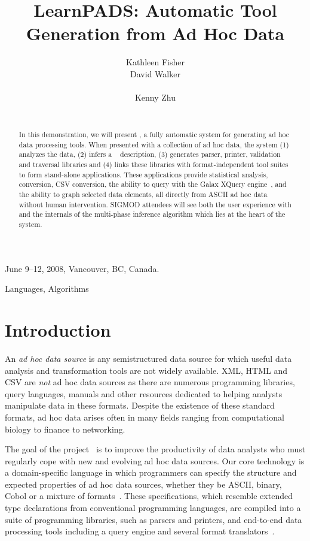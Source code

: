 \documentclass{sig-alt-release2}
\title{LearnPADS: Automatic Tool Generation from Ad Hoc Data}
\author{\alignauthor Kathleen Fisher \\
\affaddr{AT\&T Labs Research}
\email{kfisher@research.att.com}
\alignauthor David Walker \\
\affaddr{Princeton University}\\
\email{dpw@cs.princeton.edu}
\alignauthor Kenny Zhu \\
\affaddr{Princeton University}\\
\email{kzhu@cs.princeton.edu}
}
\begin{document}
 {June 9--12, 2008, Vancouver, BC, Canada.} 

\maketitle
\begin{abstract}
In this demonstration, we will present \learnpads, 
a fully automatic system for generating
ad hoc data processing tools.  When presented with a collection of
ad hoc data, the system (1) analyzes the data, (2) infers a 
\pads{}~\cite{fisher+:pads,fisher+:popl06} description, (3) 
generates parser, printer, validation and traversal libraries and (4)
links these libraries with format-independent  
tool suites to form stand-alone applications.  These applications provide
statistical analysis, \xml{}
conversion, CSV conversion, the ability to query with the 
Galax XQuery engine~\cite{fernandez+:padx}, and the ability to 
graph selected data elements, all
directly from ASCII ad hoc data without human intervention.
SIGMOD attendees will see both the user experience with \learnpads{} and
the internals of the multi-phase inference algorithm which lies at
the heart of the system. 
\end{abstract}


\terms
Languages, Algorithms

\section{Introduction}
An {\em ad hoc data source} is any semistructured data source
for which useful data analysis and transformation tools
are not widely available. XML, HTML and CSV are {\em not} 
ad hoc data sources as there are numerous programming libraries,
query languages, manuals and other resources dedicated to
helping analysts manipulate data in these formats.
Despite the existence of these standard formats, ad hoc data arises
often in many fields ranging from computational biology to finance to networking.

The goal of the \pads{} project~\cite{padsweb} is to improve the
productivity of data analysts who must regularly cope with new and evolving
ad hoc data sources.  Our core technology is a
domain-specific language in which programmers can specify the
structure and expected properties of ad hoc data sources, whether they
be ASCII, binary, Cobol or a mixture of formats~\cite{fisher+:pads,fisher+:popl06}.  These
specifications, which resemble extended type declarations from
conventional programming languages, are compiled into a suite of
programming libraries, such as parsers and printers, and 
end-to-end data processing tools including a query engine 
and several format translators~\cite{fernandez+:padl,fernandez+:padx,mandelbaum+:pads-ml}.
\end{document}
